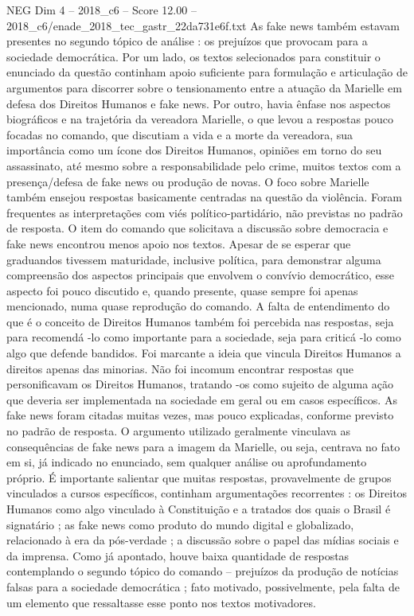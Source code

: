 \begin{textsample}{NEG Dim 4 – 2018\_c6 – Score 12.00 – 2018\_c6/enade\_2018\_tec\_gastr\_22da731e6f.txt}
As fake news também estavam presentes no segundo tópico de análise : os prejuízos que provocam para a sociedade democrática.
Por um lado, os textos selecionados para constituir o enunciado da questão continham apoio suficiente para formulação e articulação de argumentos para discorrer sobre o tensionamento entre a atuação da Marielle em defesa dos Direitos Humanos e fake news.
Por outro, havia ênfase nos aspectos biográficos e na trajetória da vereadora Marielle, o que levou a respostas pouco focadas no comando, que discutiam a vida e a morte da vereadora, sua importância como um ícone dos Direitos Humanos, opiniões em torno do seu assassinato, até mesmo sobre a responsabilidade pelo crime, muitos textos com a presença/defesa de fake news ou produção de novas.
O foco sobre Marielle também ensejou respostas basicamente centradas na questão da violência.
Foram frequentes as interpretações com viés político-partidário, não previstas no padrão de resposta.
O item do comando que solicitava a discussão sobre democracia e fake news encontrou menos apoio nos textos.
Apesar de se esperar que graduandos tivessem maturidade, inclusive política, para demonstrar alguma compreensão dos aspectos principais que envolvem o convívio democrático, esse aspecto foi pouco discutido e, quando presente, quase sempre foi apenas mencionado, numa quase reprodução do comando.
A falta de entendimento do que é o conceito de Direitos Humanos também foi percebida nas respostas, seja para recomendá -lo como importante para a sociedade, seja para criticá -lo como algo que defende bandidos.
Foi marcante a ideia que vincula Direitos Humanos a direitos apenas das minorias.
Não foi incomum encontrar respostas que personificavam os Direitos Humanos, tratando -os como sujeito de alguma ação que deveria ser implementada na sociedade em geral ou em casos específicos.
As fake news foram citadas muitas vezes, mas pouco explicadas, conforme previsto no padrão de resposta.
O argumento utilizado geralmente vinculava as consequências de fake news para a imagem da Marielle, ou seja, centrava no fato em si, já indicado no enunciado, sem qualquer análise ou aprofundamento próprio.
É importante salientar que muitas respostas, provavelmente de grupos vinculados a cursos específicos, continham argumentações recorrentes : os Direitos Humanos como algo vinculado à Constituição e a tratados dos quais o Brasil é signatário ; as fake news como produto do mundo digital e globalizado, relacionado à era da pós-verdade ; a discussão sobre o papel das mídias sociais e da imprensa.
Como já apontado, houve baixa quantidade de respostas contemplando o segundo tópico do comando – prejuízos da produção de notícias falsas para a sociedade democrática ; fato motivado, possivelmente, pela falta de um elemento que ressaltasse esse ponto nos textos motivadores.

\end{textsample}
